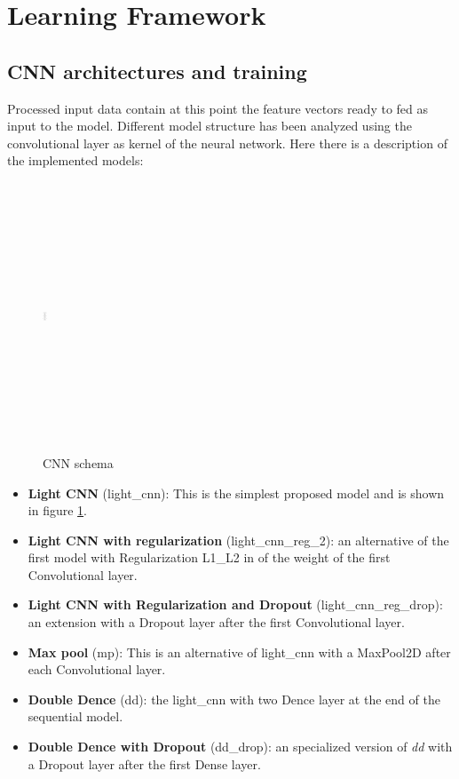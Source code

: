 \section{Learning Framework}
\label{sec:learning_framework}

\subsection*{\textbf {CNN architectures and training}}Processed input data contain at this point the feature vectors ready to fed as input to the model. Different model structure has been analyzed using the convolutional layer as kernel of the neural network. Here there is a description of the implemented models:\\
\begin{figure}[h]
			\centering
	    	\includegraphics[width=5, height=8cm, width=0.25\textwidth]{CNN_schema}
	    	\caption{CNN schema}
	    	\label{fig:CNN_schema}
\end{figure} 

\begin{itemize}
	\item \textbf{Light CNN} (light\_cnn): This is the simplest proposed model and is shown in figure \ref{fig:CNN_schema}.
	\item \textbf{Light CNN with regularization} (light\_cnn\_reg\_2): an alternative of the first model with Regularization L1\_L2 in of the weight of the first Convolutional layer.
	\item \textbf{Light CNN with Regularization and Dropout} (light\_cnn\_reg\_drop): an extension with a Dropout layer after the first Convolutional layer.
	\item \textbf{Max pool} (mp): This is an alternative of light\_cnn with a MaxPool2D after each Convolutional layer.
	\item \textbf{Double Dence} (dd): the light\_cnn with two Dence layer at the end of the sequential model.
	\item \textbf{Double Dence with Dropout} (dd\_drop): an specialized version of \textit{dd} with a Dropout layer after the first Dense layer.
\end{itemize}

